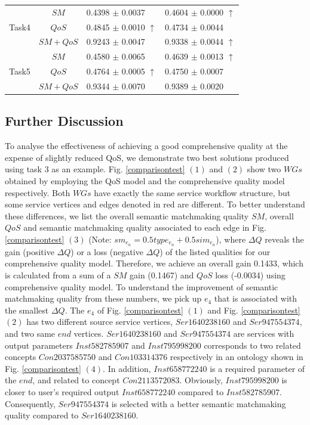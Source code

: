 \documentclass{llncs}
\begin{document}
\begin{table}[]
\begin{tabular}{c|c|l|l}
\multirow{3}{*}{Task4}  &$SM$      &0.4398 $\pm$ 0.0037               &0.4604 $\pm$ 0.0000 $\uparrow$ \\ \cline{2-4} 
                        &$QoS$     &0.4845 $\pm$ 0.0010 $\uparrow$    &0.4734 $\pm$ 0.0044            \\ \cline{2-4}
                        &$SM+QoS$  &0.9243 $\pm$ 0.0047               &0.9338 $\pm$ 0.0044 $\uparrow$           \\ \hline
\multirow{3}{*}{Task5}  &$SM$      &0.4580 $\pm$ 0.0065               &0.4639 $\pm$ 0.0013 $\uparrow$ \\ \cline{2-4} 
                        &$QoS$     &0.4764 $\pm$ 0.0005 $\uparrow$    &0.4750 $\pm$ 0.0007            \\ \cline{2-4}
                        &$SM+QoS$  &0.9344 $\pm$ 0.0070               &0.9389 $\pm$ 0.0020           \\ \hline
\end{tabular}
\end{table}
\vspace{-0.8cm}
\subsection{Further Discussion}\label{discuss1}
To analyse the effectiveness of achieving a good comprehensive quality at the expense of slightly reduced QoS, we demonstrate two best solutions produced using task 3 as an example. Fig. \ref{comparisontest} $(1)$ and $(2)$ show two $WGs$ obtained by employing the QoS model and the comprehensive quality model respectively. Both $WGs$ have exactly the same service workflow structure, but some service vertices and edges denoted in red are different. To better understand these differences, we list the overall semantic matchmaking quality $SM$,  overall $QoS$ and semantic matchmaking quality associated to each edge in Fig. \ref{comparisontest} $(3)$ (Note: $sm_{e_n} = 0.5type_{e_n} + 0.5 sim_{e_n}$), where $\Delta Q$ reveals the gain (positive $\Delta Q$) or a loss (negative $\Delta Q$) of the listed qualities for our comprehensive quality model. Therefore, we achieve an overall gain 0.1433, which is calculated from a sum of a $SM$ gain (0.1467) and $QoS$ loss (-0.0034) using comprehensive quality model. To understand the improvement of semantic matchmaking quality from these numbers, we pick up $e_4$ that is associated with the smallest $\Delta Q$. The $e_4$ of Fig. \ref{comparisontest} $(1)$ and Fig. \ref{comparisontest} $(2)$ has two different source service vertices, $Ser1640238160$ and $Ser947554374$, and two same $end$ vertices. $Ser1640238160$ and $Ser947554374$ are services with output parameters $Inst582785907$ and  $Inst795998200$ corresponds to two related concepts $Con2037585750$ and $Con103314376$ respectively in an ontology shown in Fig. \ref{comparisontest} $(4)$. In addition, $Inst658772240$ is a required parameter of the $end$, and related to concept $Con2113572083$. Obviously, $Inst795998200$ is closer to user's required output $Inst658772240$ compared to $Inst582785907$. Consequently,  $Ser947554374$ is selected with a better semantic matchmaking quality compared to $Ser1640238160$.
\vspace{-0.6cm}
\end{document}
